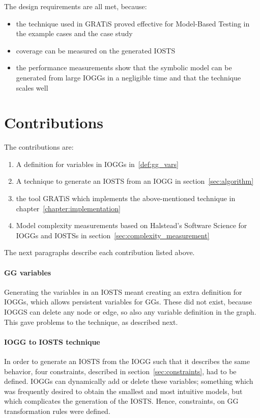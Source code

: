 The design requirements are all met, because:
\begin{itemize} 
\item the technique used in GRATiS proved effective for Model-Based Testing in the example cases and the case study
\item coverage can be measured on the generated IOSTS
\item the performance measurements show that the symbolic model can be generated from large IOGGs in a negligible time and that the technique scales well
\end{itemize}

\section{Contributions}
The contributions are:
\begin{enumerate}
\item A definition for variables in IOGGs in~\ref{def:gg_vars}
\item A technique to generate an IOSTS from an IOGG in section~\ref{sec:algorithm}
\item the tool GRATiS which implements the above-mentioned technique in chapter~\ref{chapter:implementation}
\item Model complexity measurements based on Halstead's Software Science for IOGGs and IOSTSs in section~\ref{sec:complexity_measurement}
\end{enumerate}

The next paragraphs describe each contribution listed above.

\paragraph*{GG variables}
Generating the variables in an IOSTS meant creating an extra definition for IOGGs, which allows persistent variables for GGs. These did not exist, because IOGGS can delete any node or edge, so also any variable definition in the graph. This gave problems to the technique, as described next.

\paragraph*{IOGG to IOSTS technique}
In order to generate an IOSTS from the IOGG such that it describes the same behavior, four constraints, described in section~\ref{sec:constraints}, had to be defined. IOGGs can dynamically add or delete these variables; something which was frequently desired to obtain the smallest and most intuitive models, but which complicates the generation of the IOSTS. Hence, constraints, on GG transformation rules were defined.


